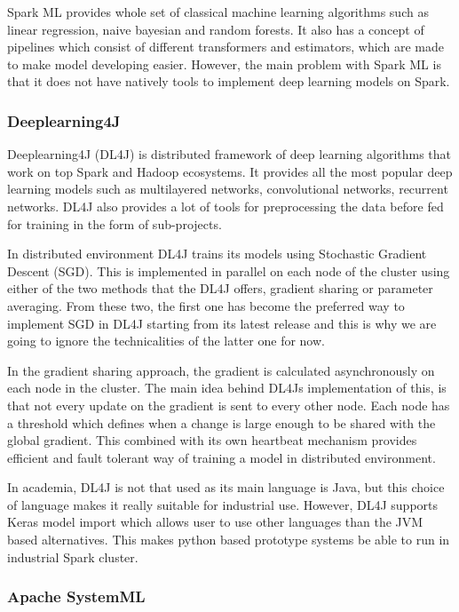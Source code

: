 Spark ML provides whole set of classical machine learning algorithms such as linear regression, naive bayesian and random forests.
It also has a concept of pipelines which consist of different transformers and estimators, which are made to make model developing easier.
However, the main problem with Spark ML is that it does not have natively tools to implement deep learning models on Spark.

\subsubsection{Deeplearning4J}

Deeplearning4J (DL4J) is distributed framework of deep learning algorithms that work on top Spark and Hadoop ecosystems.
It provides all the most popular deep learning models such as multilayered networks, convolutional networks, recurrent networks.
DL4J also provides a lot of tools for preprocessing the data before fed for training in the form of sub-projects. \cite{dl4j}

In distributed environment DL4J trains its models using Stochastic Gradient Descent (SGD).
This is implemented in parallel on each node of the cluster using either of the two methods that the DL4J offers, gradient sharing or parameter averaging.
From these two, the first one has become the preferred way to implement SGD in DL4J starting from its latest release and this is why we are going to ignore the technicalities of the latter one for now.

In the gradient sharing approach, the gradient is calculated asynchronously on each node in the cluster.
The main idea behind DL4Js implementation of this, is that not every update on the gradient is sent to every other node.
Each node has a threshold which defines when a change is large enough to be shared with the global gradient.
This combined with its own heartbeat mechanism provides efficient and fault tolerant way of training a model in distributed environment. \cite{dl4j}

In academia, DL4J is not that used as its main language is Java, but this choice of language makes it really suitable for industrial use.
However, DL4J supports Keras model import which allows user to use other languages than the JVM based alternatives.
This makes python based prototype systems be able to run in industrial Spark cluster. \cite{dl4j}

\subsubsection{Apache SystemML}

